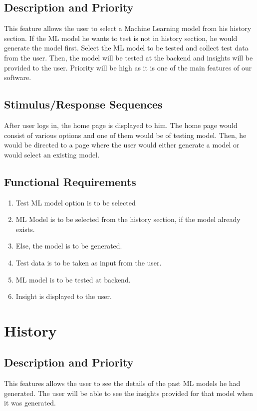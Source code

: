 \documentclass[12pt]{scrreprt}
\begin{document}
\subsection{Description and Priority}
This feature allows the user to select a Machine Learning model from his history section. If the ML model he wants to test is not in history section, he would generate the model first. Select the ML model to be tested and collect test data from the user. Then, the model will be tested at the backend and insights will be provided to the user. Priority will be high as it is one of the main features of our software.

\subsection{Stimulus/Response Sequences}
 After user logs in, the home page is displayed to him. The home page would consist of various options and one of them would be of testing model. Then, he would be directed to a page where the user would either generate a model or would select an existing model.

\subsection{Functional Requirements}
\begin{enumerate}
\item Test ML model option is to be selected
\item ML Model is to be selected from the history section, if the model already exists. 
\item Else, the model is to be generated.
\item Test data is to be taken as input from the user.
\item ML model is to be tested at backend.
\item Insight is displayed to the user.
\end{enumerate}

\section{History}

\subsection{Description and Priority}
This features allows the user to see the details of the past ML models he had generated. The user will be able to see the insights provided for that model when it was generated.
\end{document}
